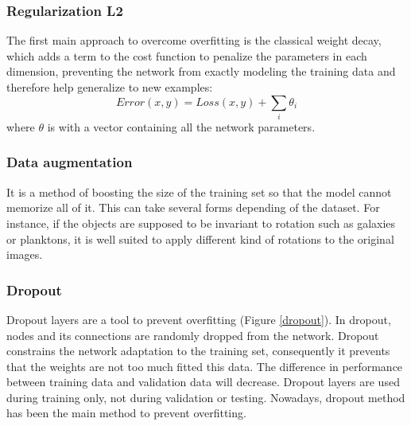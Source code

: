     \subsubsection{Regularization L2}
    The  first  main  approach  to  overcome  overfitting  is  the  classical weight decay, which adds a term to the cost function to penalize the parameters in each dimension, preventing the network from exactly modeling the training data and therefore help generalize to new examples:
    \begin{equation}
        Error(x, y) =  Loss(x, y) + \sum_{i}\theta_i
    \end{equation}
    where $\theta$ is with a vector containing all the network parameters.
    \subsubsection{Data augmentation}
    It is a method of boosting the size of the training set so that the model cannot memorize all of it.  This can take several forms depending of the dataset. For  instance,  if  the  objects  are  supposed  to  be  invariant  to  rotation  such  as  galaxies  or planktons, it is well suited to apply different kind of rotations to the original images.

    \subsubsection{Dropout}
    Dropout layers\cite{srivastava2014dropout} are a tool to prevent overfitting (Figure \ref{dropout}). In dropout, nodes and its connections are randomly dropped from the network. Dropout constrains the network adaptation to the training set, consequently it prevents that the weights are not too much fitted this data. The difference in performance between training data and validation data will decrease. Dropout layers are used during training only, not during validation or testing. Nowadays, dropout method has been the main method to prevent overfitting.

